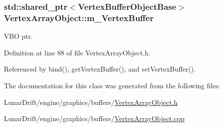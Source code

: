 \subsubsection[{\texorpdfstring{m\+\_\+\+Vertex\+Buffer}{m_VertexBuffer}}]{\setlength{\rightskip}{0pt plus 5cm}std\+::shared\+\_\+ptr$<${\bf Vertex\+Buffer\+Object\+Base}$>$ Vertex\+Array\+Object\+::m\+\_\+\+Vertex\+Buffer\hspace{0.3cm}{\ttfamily [private]}}\hypertarget{class_vertex_array_object_a2e6040e6adfc2bbcf29d48013c48af04}{}\label{class_vertex_array_object_a2e6040e6adfc2bbcf29d48013c48af04}


V\+BO ptr. 



Definition at line 88 of file Vertex\+Array\+Object.\+h.



Referenced by bind(), get\+Vertex\+Buffer(), and set\+Vertex\+Buffer().



The documentation for this class was generated from the following files\+:\begin{DoxyCompactItemize}
\item 
Lunar\+Drift/engine/graphics/buffers/\hyperlink{_vertex_array_object_8h}{Vertex\+Array\+Object.\+h}\item 
Lunar\+Drift/engine/graphics/buffers/\hyperlink{_vertex_array_object_8cpp}{Vertex\+Array\+Object.\+cpp}\end{DoxyCompactItemize}
